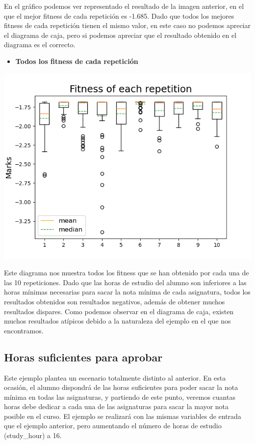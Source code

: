 \documentclass[11pt, a4paper, titlepage]{article}
\begin{document}
En el gráfico podemos ver representado el resultado de la imagen anterior, en el que el mejor fitness de cada repetición es -1.685. Dado que todos los mejores fitness de cada repetición tienen el mismo valor, en este caso no podemos apreciar el diagrama de caja, pero si podemos apreciar que el resultado obtenido en el diagrama es el correcto.

\newpage

\begin{itemize}
\item \textbf{Todos los fitness de cada repetición}
\end{itemize}

\includegraphics[scale=0.6]{img/grafica2_horinsuf}

Este diagrama nos muestra todos los fitness que se han obtenido por cada una de las 10 repeticiones. Dado que las horas de estudio del alumno son inferiores a las horas mínimas necesarias para sacar la nota mínima de cada asignatura, todos los resultados obtenidos son resultados negativos, además de obtener muchos resultados dispares. Como podemos observar en el diagrama de caja, existen muchos resultados atípicos debido a la naturaleza del ejemplo en el que nos encontramos.

\subsection{Horas suficientes para aprobar}
Este ejemplo plantea un escenario totalmente distinto al anterior. En esta ocasión, el alumno dispondrá de las horas suficientes para poder sacar la nota mínima en todas las asignaturas, y partiendo de este punto, veremos cuantas horas debe dedicar a cada una de las asignaturas para sacar la mayor nota posible en el curso. El ejemplo se realizará con las mismas variables de entrada que el ejemplo anterior, pero aumentando el número de horas de estudio (study\_hour) a 16.
\end{document}
